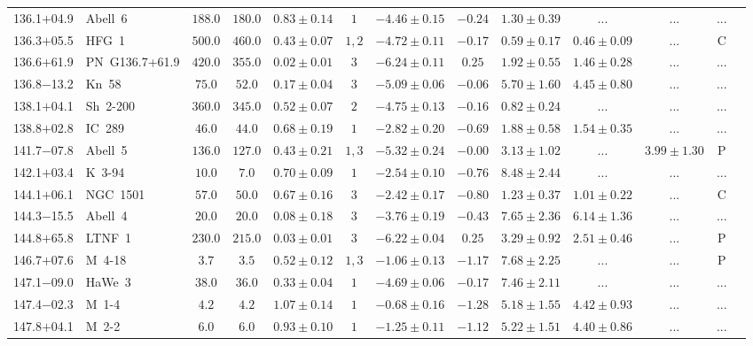\documentclass[useAMS]{mn2e}
\begin{document}
\begin{center}
{\begin{longtable}{llccccccccccc}
136.1$+$04.9&Abell~6&$     188.0$&$     180.0$&$0.83 \pm 0.14$&$1$&$-4.46 \pm 0.15$&$     -0.24$&$1.30 \pm 0.39$&$...$&$...$&...\\
136.3$+$05.5&HFG~1&$     500.0$&$     460.0$&$0.43 \pm 0.07$&$1,2$&$-4.72 \pm 0.11$&$     -0.17$&$0.59 \pm 0.17$&$0.46 \pm 0.09$&$...$&C\\
136.6$+$61.9&PN~G136.7+61.9&$     420.0$&$     355.0$&$0.02 \pm 0.01$&$3$&$-6.24 \pm 0.11$&$      0.25$&$1.92 \pm 0.55$&$1.46 \pm 0.28$&$...$&...\\
136.8$-$13.2&Kn~58&$      75.0$&$      52.0$&$0.17 \pm 0.04$&$3$&$-5.09 \pm 0.06$&$     -0.06$&$5.70 \pm 1.60$&$4.45 \pm 0.80$&$...$&...\\
138.1$+$04.1&Sh~2-200&$     360.0$&$     345.0$&$0.52 \pm 0.07$&$2$&$-4.75 \pm 0.13$&$     -0.16$&$0.82 \pm 0.24$&$...$&$...$&...\\
138.8$+$02.8&IC~289&$      46.0$&$      44.0$&$0.68 \pm 0.19$&$1$&$-2.82 \pm 0.20$&$     -0.69$&$1.88 \pm 0.58$&$1.54 \pm 0.35$&$...$&...\\
141.7$-$07.8&Abell~5&$     136.0$&$     127.0$&$0.43 \pm 0.21$&$1,3$&$-5.32 \pm 0.24$&$     -0.00$&$3.13 \pm 1.02$&$...$&$3.99 \pm 1.30$&P\\
142.1$+$03.4&K~3-94&$      10.0$&$       7.0$&$0.70 \pm 0.09$&$1$&$-2.54 \pm 0.10$&$     -0.76$&$8.48 \pm 2.44$&$...$&$...$&...\\
144.1$+$06.1&NGC~1501&$      57.0$&$      50.0$&$0.67 \pm 0.16$&$3$&$-2.42 \pm 0.17$&$     -0.80$&$1.23 \pm 0.37$&$1.01 \pm 0.22$&$...$&C\\
144.3$-$15.5&Abell~4&$      20.0$&$      20.0$&$0.08 \pm 0.18$&$3$&$-3.76 \pm 0.19$&$     -0.43$&$7.65 \pm 2.36$&$6.14 \pm 1.36$&$...$&...\\
144.8$+$65.8&LTNF~1&$     230.0$&$     215.0$&$0.03 \pm 0.01$&$3$&$-6.22 \pm 0.04$&$      0.25$&$3.29 \pm 0.92$&$2.51 \pm 0.46$&$...$&P\\
146.7$+$07.6&M~4-18&$       3.7$&$       3.5$&$0.52 \pm 0.12$&$1,3$&$-1.06 \pm 0.13$&$     -1.17$&$7.68 \pm 2.25$&$...$&$...$&P\\
147.1$-$09.0&HaWe~3&$      38.0$&$      36.0$&$0.33 \pm 0.04$&$1$&$-4.69 \pm 0.06$&$     -0.17$&$7.46 \pm 2.11$&$...$&$...$&...\\
147.4$-$02.3&M~1-4&$       4.2$&$       4.2$&$1.07 \pm 0.14$&$1$&$-0.68 \pm 0.16$&$     -1.28$&$5.18 \pm 1.55$&$4.42 \pm 0.93$&$...$&...\\
147.8$+$04.1&M~2-2&$       6.0$&$       6.0$&$0.93 \pm 0.10$&$1$&$-1.25 \pm 0.11$&$     -1.12$&$5.22 \pm 1.51$&$4.40 \pm 0.86$&$...$&...\\

\end{longtable}}
\end{center}
\end{document}
